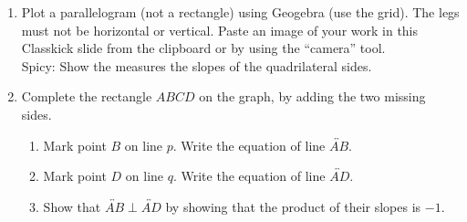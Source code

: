 \begin{enumerate}
\item Plot a parallelogram (not a rectangle) using Geogebra (use the grid). The legs must not be horizontal or vertical. Paste an image of your work in this Classkick slide from the clipboard or by using the ``camera'' tool.\\[0.25cm]
Spicy: Show the measures the slopes of the quadrilateral sides.

\item Complete the rectangle $ABCD$ on the graph, by adding the two missing sides.
\begin{multicols}{2}
    \begin{enumerate}[itemsep=2cm]
      \item Mark point $B$ on line $p$. Write the equation of line $\overleftrightarrow{AB}$.
      \item Mark point $D$ on line $q$. Write the equation of line $\overleftrightarrow{AD}$.
      \item Show that $\overleftrightarrow{AB} \perp \overleftrightarrow{AD}$ by showing that the product of their slopes is $-1$.
      \end{enumerate}
    \begin{flushright}
    \end{flushright}
\end{multicols}


\end{enumerate}

